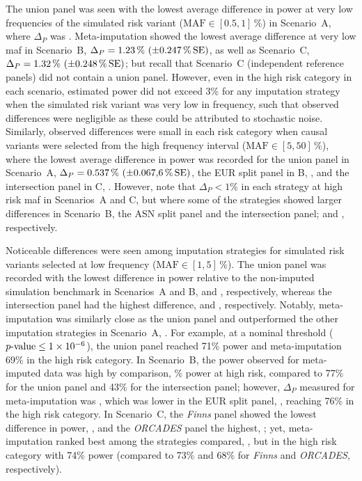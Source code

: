 The union panel was seen with the lowest average difference in power at very low frequencies of the simulated risk variant (${\text{MAF} \in [0.5, 1]\,\%}$) in Scenario~A, where $\Delta_P$ was .
Meta-imputation showed the lowest average difference at very low \gls{maf} in Scenario~B, $\Delta_P=\MeanPercent{1.22764}{0.24728}$, as well as Scenario~C, $\Delta_P=\MeanPercent{1.31707}{0.24796}$; but recall that Scenario~C (independent reference panels) did not contain a union panel.
However, even in the high risk category in each scenario, estimated power did not exceed 3\% for any imputation strategy when the simulated risk variant was very low in frequency, such that observed differences were negligible as these could be attributed to stochastic noise.
Similarly, observed differences were small in each risk category when causal variants were selected from the high frequency interval (${\text{MAF} \in [5,50]\,\%}$), where the lowest average difference in power was recorded for the union panel in Scenario~A, $\Delta_P=\MeanPercent{0.53658}{0.06760}$, the EUR split panel in B, , and the intersection panel in C, .
However, note that ${\Delta_P<1\%}$ in each strategy at high risk \gls{maf} in Scenarios~A and C, but where some of the strategies showed larger differences in Scenario~B, \eg the ASN split panel and the intersection panel;  and , respectively.

Noticeable differences were seen among imputation strategies for simulated risk variants selected at low frequency (${\text{MAF} \in [1, 5]\,\%}$).
The union panel was recorded with the lowest difference in power relative to the non-imputed simulation benchmark in Scenarios~A and B,  and , respectively, whereas the intersection panel had the highest difference,  and , respectively.
Notably, meta-imputation was similarly close as the union panel and outperformed the other imputation strategies in Scenario~A, .
For example, at a nominal threshold (${\mbox{$p$-value}\leq1\times10^{-6}}$), the union panel reached 71\% power and meta-imputation 69\% in the high risk category.
In Scenario~B, the power observed for meta-imputed data was high by comparison,
\% power at high risk, compared to 77\% for the union panel and 43\% for the intersection panel; however, $\Delta_P$ measured for meta-imputation was , which was lower in the EUR split panel, , reaching 76\% in the high risk category.
In Scenario~C, the \emph{Finns} panel showed the lowest difference in power, , and the \emph{ORCADES} panel the highest, ; yet, meta-imputation ranked  best among the strategies compared, , but  in the high risk category with 74\% power (compared to 73\% and 68\% for \emph{Finns} and \emph{ORCADES}, respectively).



